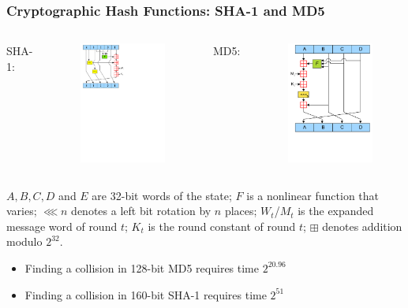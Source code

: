 \begin{frame}\frametitle{Cryptographic Hash Functions: SHA-1 and MD5}
\begin{columns}[c]
SHA-1:
\begin{figure}
\begin{center}
\includegraphics[width=40mm]{pic/SHA1}
\end{center}
\end{figure}
MD5:
\begin{figure}
\begin{center}
\includegraphics[width=40mm]{pic/MD5}
\end{center}
\end{figure}
\end{columns}
$A, B, C, D$ and $E$ are 32-bit words of the state;
$F$ is a nonlinear function that varies;
$\lll n$ denotes a left bit rotation by $n$ places;
$W_t$/$M_t$ is the expanded message word of round $t$;
$K_t$ is the round constant of round $t$;
$\boxplus$ denotes addition modulo $2^{32}$.
\begin{itemize}
\item Finding a collision in 128-bit MD5 requires time $2^{20.96}$
\item Finding a collision in 160-bit SHA-1 requires time $2^{51}$
\end{itemize}
\end{frame}
